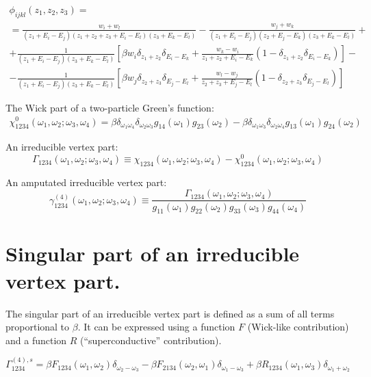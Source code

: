 \documentclass{article}
\begin{document}
\begin{multline*}
    \phi_{ijkl}(z_1,z_2,z_3) = \\ =
        \frac{w_i + w_l}{(z_1+E_i-E_j)(z_1+z_2+z_3+E_i-E_l)(z_3+E_k-E_l)} -
        \frac{w_j + w_k}{(z_1+E_i-E_j)(z_2+E_j-E_k)(z_3+E_k-E_l)} + \\ +
        \frac{1}{(z_1+E_i-E_j)(z_3+E_k-E_l)}
            \left[\beta w_i\delta_{z_1+z_2}\delta_{E_i-E_k} + 
            \frac{w_k-w_i}{z_1+z_2+E_i-E_k}(1-\delta_{z_1+z_2}\delta_{E_i-E_k})\right] -\\-
        \frac{1}{(z_1+E_i-E_j)(z_3+E_k-E_l)}
            \left[\beta w_j\delta_{z_2+z_3}\delta_{E_j-E_l} + 
            \frac{w_l-w_j}{z_2+z_3+E_j-E_l}(1-\delta_{z_2+z_3}\delta_{E_j-E_l})\right]
\end{multline*}

The Wick part of a two-particle Green's function:
\begin{eqnarray*}
    \chi^0_{1234}(\omega_1,\omega_2;\omega_3,\omega_4) = 
        \beta\delta_{\omega_1\omega_4}\delta_{\omega_2\omega_3}g_{14}(\omega_1)g_{23}(\omega_2) -
        \beta\delta_{\omega_1\omega_3}\delta_{\omega_2\omega_4}g_{13}(\omega_1)g_{24}(\omega_2)
\end{eqnarray*}

An irreducible vertex part:
\[
    \Gamma_{1234}(\omega_1,\omega_2;\omega_3,\omega_4) \equiv 
        \chi_{1234}(\omega_1,\omega_2;\omega_3,\omega_4) -
        \chi^{0}_{1234}(\omega_1,\omega_2;\omega_3,\omega_4)
\]

An amputated irreducible vertex part:
\[
    \gamma^{(4)}_{1234}(\omega_1,\omega_2;\omega_3,\omega_4) \equiv 
        \frac{\Gamma_{1234}(\omega_1,\omega_2;\omega_3,\omega_4) 
        }{g_{11}(\omega_1)g_{22}(\omega_2)g_{33}(\omega_3)g_{44}(\omega_4)}
\]

\section{Singular part of an irreducible vertex part.}

The singular part of an irreducible vertex part is defined as a sum of all terms proportional to $\beta$.
It can be expressed using a function $F$ (Wick-like contribution) and a function $R$ (``superconductive'' contribution).

\begin{equation*}
    \Gamma^{(4),s}_{1234} = 
          \beta F_{1234}(\omega_1,\omega_2) \delta_{\omega_2-\omega_3} 
        - \beta F_{2134}(\omega_2,\omega_1) \delta_{\omega_1-\omega_3}
        + \beta R_{1234}(\omega_1,\omega_3) \delta_{\omega_1+\omega_2}
\end{equation*}
\end{document}
